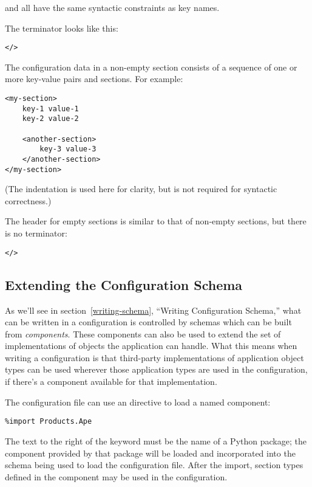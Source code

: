 \documentclass{howto}
\begin{document}
 and  all have the same syntactic
constraints as key names.

The terminator looks like this:

\begin{alltt}
</>
\end{alltt}

The configuration data in a non-empty section consists of a sequence
of one or more key-value pairs and sections.  For example:

\begin{verbatim}
<my-section>
    key-1 value-1
    key-2 value-2

    <another-section>
        key-3 value-3
    </another-section>
</my-section>
\end{verbatim}

(The indentation is used here for clarity, but is not required for
syntactic correctness.)

The header for empty sections is similar to that of non-empty
sections, but there is no terminator:

\begin{alltt}
<  />
\end{alltt}


\subsection{Extending the Configuration Schema}

As we'll see in section~\ref{writing-schema}, ``Writing Configuration
Schema,'' what can be written in a configuration is controlled by
schemas which can be built from \emph{components}.  These components
can also be used to extend the set of implementations of objects the
application can handle.  What this means when writing a configuration
is that third-party implementations of application object types can be
used wherever those application types are used in the configuration,
if there's a  component available for that
implementation.

The configuration file can use an  directive to load
a named component:

\begin{verbatim}
%import Products.Ape
\end{verbatim}

The text to the right of the  keyword must be the
name of a Python package; the  component provided by
that package will be loaded and incorporated into the schema being
used to load the configuration file.  After the import, section types
defined in the component may be used in the configuration.
\end{document}
